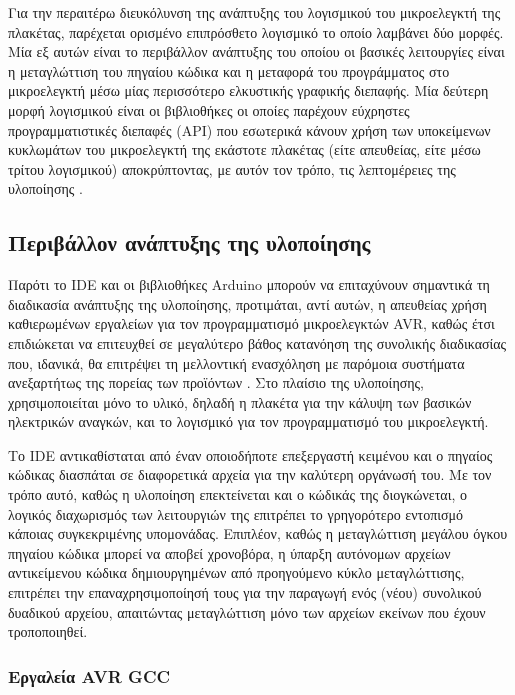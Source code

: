 Για την περαιτέρω διευκόλυνση της ανάπτυξης του λογισμικού του μικροελεγκτή της
πλακέτας,
παρέχεται ορισμένο επιπρόσθετο λογισμικό  το οποίο λαμβάνει δύο
μορφές. Μία εξ αυτών είναι το περιβάλλον ανάπτυξης  του οποίου
οι βασικές λειτουργίες είναι η μεταγλώττιση του πηγαίου κώδικα και η μεταφορά
του προγράμματος στο μικροελεγκτή \parencite{arduino:environ} μέσω μίας
περισσότερο ελκυστικής γραφικής διεπαφής. Μία δεύτερη μορφή
λογισμικού είναι οι βιβλιοθήκες  οι οποίες παρέχουν εύχρηστες
προγραμματιστικές διεπαφές (API) που εσωτερικά κάνουν χρήση των υποκείμενων
κυκλωμάτων του μικροελεγκτή της εκάστοτε πλακέτας (είτε απευθείας, είτε μέσω
τρίτου λογισμικού) αποκρύπτοντας, με αυτόν τον τρόπο, τις λεπτομέρειες της
υλοποίησης \parencite{arduino:lib}.


\subsection{Περιβάλλον ανάπτυξης της υλοποίησης}

Παρότι το IDE και οι βιβλιοθήκες Arduino μπορούν να επιταχύνουν σημαντικά τη
διαδικασία ανάπτυξης της υλοποίησης, προτιμάται, αντί αυτών, η απευθείας χρήση
καθιερωμένων εργαλείων για τον προγραμματισμό μικροελεγκτών AVR, καθώς έτσι
επιδιώκεται να επιτευχθεί σε μεγαλύτερο βάθος κατανόηση της συνολικής
διαδικασίας που, ιδανικά, θα επιτρέψει τη μελλοντική ενασχόληση με παρόμοια
συστήματα ανεξαρτήτως της πορείας των προϊόντων . Στο πλαίσιο της
υλοποίησης, χρησιμοποιείται μόνο το υλικό, δηλαδή η πλακέτα  για την
κάλυψη των βασικών ηλεκτρικών αναγκών, και το λογισμικό  για τον
προγραμματισμό του μικροελεγκτή.

Το IDE αντικαθίσταται από έναν οποιοδήποτε επεξεργαστή κειμένου και ο πηγαίος
κώδικας διασπάται σε διαφορετικά αρχεία για την καλύτερη οργάνωσή του.
Με τον τρόπο αυτό, καθώς η υλοποίηση επεκτείνεται και ο κώδικάς της διογκώνεται,
ο λογικός διαχωρισμός των λειτουργιών της επιτρέπει το γρηγορότερο εντοπισμό
κάποιας συγκεκριμένης υπομονάδας. Επιπλέον, καθώς η μεταγλώττιση μεγάλου όγκου
πηγαίου κώδικα μπορεί να αποβεί χρονοβόρα, η ύπαρξη αυτόνομων αρχείων
αντικείμενου κώδικα δημιουργημένων από προηγούμενο κύκλο μεταγλώττισης,
επιτρέπει την επαναχρησιμοποίησή τους για την παραγωγή ενός (νέου) συνολικού
δυαδικού αρχείου, απαιτώντας μεταγλώττιση μόνο των αρχείων εκείνων που έχουν
τροποποιηθεί.


\subsubsection{Εργαλεία AVR GCC}

